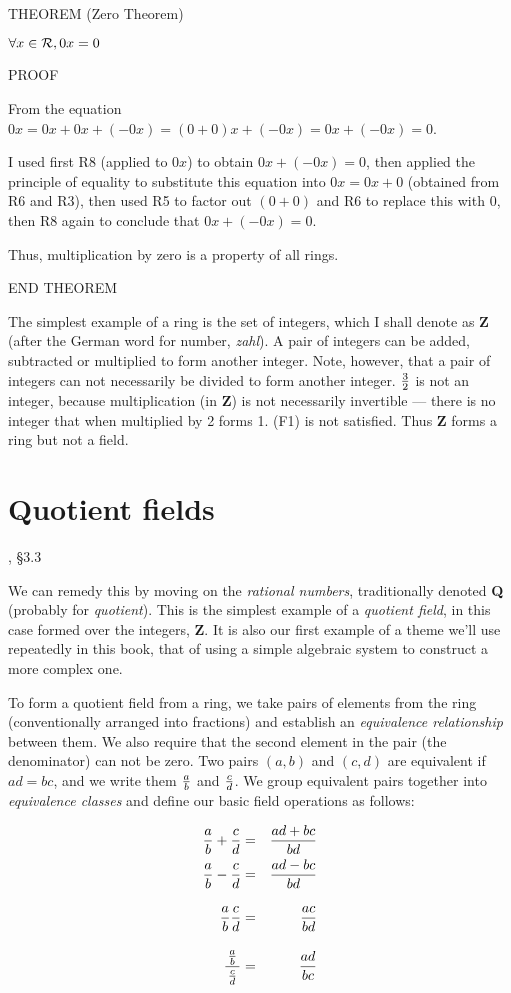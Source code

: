 THEOREM (Zero Theorem)

$\forall x\in{\cal R}, 0x=0$

PROOF

From the equation $0x=0x+0x+(-0x)=(0+0)x+(-0x)=0x+(-0x)=0$.

I used
first R8 (applied to $0x$) to obtain $0x+(-0x)=0$, then applied the
principle of equality to substitute this equation into $0x=0x+0$
(obtained from R6 and R3), then used R5 to factor out $(0+0)$ and R6
to replace this with $0$, then R8 again to conclude that $0x+(-0x)=0$.

Thus, multiplication by zero is a property of all rings.

END THEOREM

The simplest example of a ring is the set of integers, which I shall
denote as {\bf Z} (after the German word for number, {\it zahl}).  A pair
of integers can be added, subtracted or multiplied to form another
integer.  Note, however, that a pair of integers can not necessarily
be divided to form another integer.  $3 \over 2$ is not an integer,
because multiplication (in {\bf Z}) is not necessarily invertible ---
there is no integer that when multiplied by 2 forms 1.
(F1) is not satisfied.
Thus {\bf Z} forms a ring but not a field.

\section{Quotient fields}
, \S3.3

We can remedy this by moving on the {\it rational numbers},
traditionally denoted {\bf Q} (probably for {\it quotient}).  This is the
simplest example of a {\it quotient field}, in this case formed over
the integers, {\bf Z}.  It is also our first example of a theme
we'll use repeatedly in this book, that of using a simple
algebraic system to construct a more complex one.

To form a quotient field from a ring, we take pairs of elements from
the ring (conventionally arranged into fractions) and establish an
{\it equivalence relationship} between them.  We also require that the
second element in the pair (the denominator) can not be zero.  Two
pairs $(a,b)$ and $(c,d)$ are equivalent if $ad=bc$, and we write them
$a\over b$ and $c\over d$.  We group equivalent pairs together into
{\it equivalence classes} and define our basic field operations as
follows:

\begin{center}
\begin{eqnarray*}
{a\over b} + {c\over d} &=& {{ad+bc}\over{bd}} \cr
{a\over b} - {c\over d} &=& {{ad-bc}\over{bd}} \cr
{a\over b} {c\over d} &=& {{ac}\over{bd}} \vbox to20pt{}\cr
{\,{a\over b}\, \over {c \over d}} &=& {{ad}\over{bc}} \vbox to24pt{}\cr
\end{eqnarray*}
\end{center}

